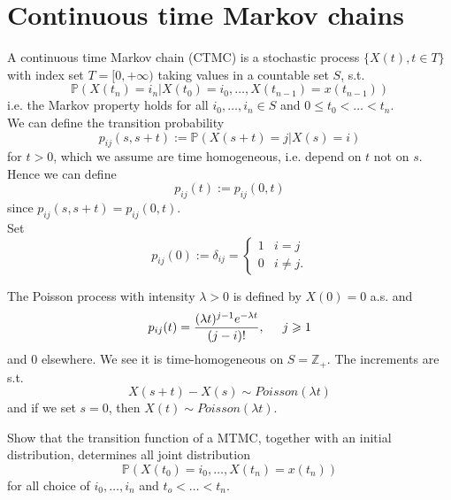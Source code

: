 \documentclass{article}
\begin{document}
\section{Continuous time Markov chains}
\begin{definition}
    A continuous time Markov chain (CTMC) is a stochastic process $\{X(t), t \in T\}$ with index set $T=[0,+ \infty)$ taking values in a countable set $S$, s.t. 
    \begin{equation*}
        \mathbb{P}(X(t_n)=i_n | X(t_0)=i_0, \dots, X(t_{n-1})= x(t_{n-1}))
    \end{equation*}
    i.e. the Markov property holds for all $i_0, \dots, i_n \in S$ and $0\leqslant t_0 < \dots < t_n$. \\
    We can define the transition probability 
    \begin{equation*}
        p_{ij}(s,s+t):= \mathbb{P}(X(s+t)=j|X(s)=i)
    \end{equation*}
    for $t>0$, which we assume are time homogeneous, i.e. depend on $t$ not on $s$. Hence we can define 
    \begin{equation*}
        p_{ij}(t):= p_{ij}(0,t)
    \end{equation*}
    since $p_{ij}(s,s+t)= p_{ij}(0,t)$.\\
    Set \[p_{ij}(0):=\delta_{ij}=\begin{cases}
        1 &i=j\\
        0 &i\neq j.
    \end{cases}\]
\end{definition}
\begin{example}
    The Poisson process with intensity $\lambda>0 $ is defined by $X(0)=0$ a.s. and 
\begin{equation*}
    p_{ij}(t)= \frac{(\lambda t)^{j-1}e^{-\lambda t}}{(j-i)!}, \hspace{0.5 cm} j \geqslant 1
\end{equation*}
and $0$ elsewhere. We see it is time-homogeneous on $S = \mathbb{Z}_+$. The increments are s.t.
\begin{equation*}
    X(s+t)-X(s) \sim Poisson (\lambda t)
\end{equation*}
and if we set $s=0$, then $X(t) \sim Poisson(\lambda t)$.
\end{example}
\begin{exercise}
     Show that the transition function of a MTMC, together with an initial distribution, determines all joint distribution 
\begin{equation*}
    \mathbb{P}( X(t_0)=i_0, \dots, X(t_{n})= x(t_{n}))
\end{equation*}
for all choice of $i_0, \dots, i_n$ and $t_o <\dots < t_n$. \\
\end{exercise}
\end{document}
